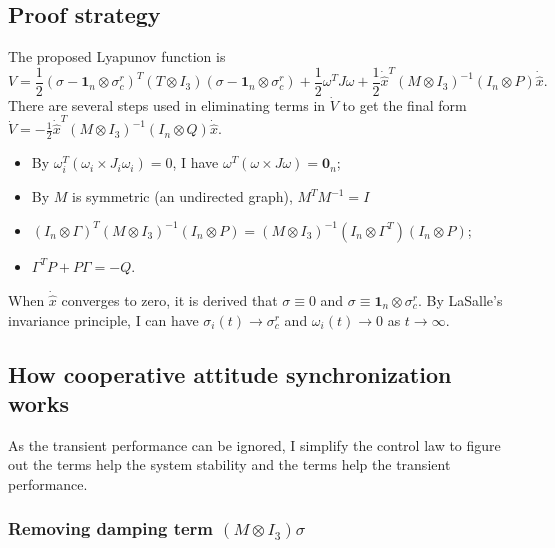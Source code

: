 \subsection{Proof strategy}
\label{sec:coop_att_syn:proof}

The proposed Lyapunov function is 
\begin{equation}
V = \frac{1}{2} ( \sigma - \mathbf{1}_{n} \otimes \sigma^{r}_{c} )^{T} ( T \otimes I_{3} ) ( \sigma - \mathbf{1}_{n} \otimes \sigma^{r}_{c} ) + \frac{1}{2} \omega^{T} J \omega + \frac{1}{2} \dot{\hat{x}}^{T} ( M \otimes I _{3} )^{-1} ( I_{n} \otimes P ) \dot{\hat{x}}.
\end{equation}
There are several steps used in eliminating terms in $ \dot{V} $ to get the final form $ \dot{V} = - \frac{1}{2} \dot{\hat{x}}^{T} (M \otimes I_{3})^{-1} (I_{n} \otimes Q) \dot{\hat{x}} $.
\begin{itemize}
\item By $ \omega^{T}_{i} ( \omega_{i} \times J_{i} \omega_{i} ) = 0 $, I have
$ \omega^{T} ( \omega \times J \omega ) = \mathbf{0}_{n} $;
\item By $ M $ is symmetric (an undirected graph), $ M^{T} M^{-1} = I $
\item $ ( I_{n} \otimes \Gamma )^{T} ( M \otimes I_{3} )^{-1} ( I_{n} \otimes P ) = ( M \otimes I_{3} )^{-1} ( I_{n} \otimes \Gamma^{T} ) ( I_{n} \otimes P ) $;
\item $ \Gamma^{T} P + P \Gamma = - Q $.
\end{itemize}
When $ \dot{\hat{x}} $ converges to zero, it is derived that $ \sigma \equiv 0 $ and $ \sigma \equiv \mathbf{1}_{n} \otimes \sigma^{r}_{c} $.
By LaSalle's invariance principle, I can have $ \sigma_{i}(t) \rightarrow \sigma^{r}_{c} $ and $ \omega_{i} (t) \rightarrow 0 $ as $ t \rightarrow \infty $.

\subsection{How cooperative attitude synchronization works}
\label{sec:coop_att_syn:analysis}

As the transient performance can be ignored, I simplify the control law to figure out the terms help the system stability and the terms help the transient performance.

\subsubsection{Removing damping term $ ( M \otimes I_{3} ) \sigma $}
\label{sec:coop_att_syn:analysis:a}

